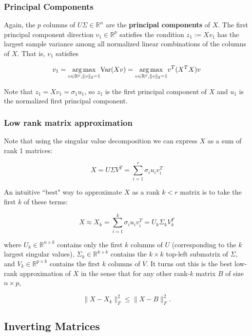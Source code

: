 \subsubsection{Principal Components}\label{linalg.sec.pr.comps}

Again, the \(p\) columns of \(U\Sigma \in \mathbb{R}^n\) are the \textbf{principal components} of \(X\). The first principal component direction \(v_1 \in \mathbb{R}^p\) satisfies the condition \( z_1 := X v_1 \) has the largest sample variance among all normalized linear combinations of the columns of \(X\). That is, \(v_1\) satisfies

\[
v_1 = \underset{ v \in \mathbb{R}^p, \lVert v \rVert_2 = 1}{\arg \max}  \mathrm{Var}(Xv) = \underset{ v \in \mathbb{R}^p, \lVert v \rVert_2 = 1}{\arg \max}  v^T(X^TX)v
\]

Note that \(z_1 = Xv_1 = \sigma_1 u_1\), so \(z_1\) is the first principal component of \(X\) and \(u_1\) is the normalized first principal component.

\subsubsection{Low rank matrix approximation}

Note that using the singular value decomposition we can express \(X\) as a sum of rank 1 matrices:

\[
X =U \Sigma V^T = \sum_{i=1}^r \sigma_i  u_i v_i^T
\]

An intuitive ``best" way to approximate \(X\) as a rank \(k < r\) matrix is to take the first \(k\) of these terms:

\[
X \approx X_k = \sum_{i=1}^k \sigma_i u_i v_i^T = U_k \Sigma_k V_k^T
\]

where \(U_k \in \mathbb{R}^{n \times k}\) contains only the first \(k\) columns of \(U\) (corresponding to the \(k\) largest singular values), \(\Sigma_k \in \mathbb{R}^{k \times k}\) contains the \(k \times k\) top-left submatrix of \(\Sigma\), and \(V_k \in \mathbb{R}^{p \times k}\) contains the first \(k\) columns of \(V\). It turns out this is the best low-rank approximation of \(X\) in the sense that for any other rank-\(k\) matrix \(B\) of size \(n \times p\),

\[
\lVert X - X_k \rVert_F^2 \leq \lVert X - B \rVert_F^2 .
\]

\subsection{Inverting Matrices}

